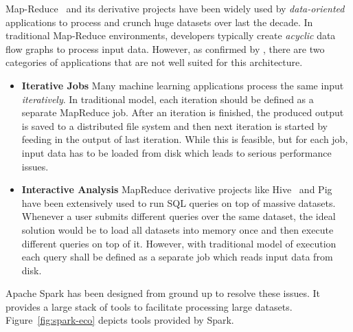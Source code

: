 Map-Reduce~\cite{Dean:2004} and its derivative projects have been widely used by \emph{data-oriented} applications to process and crunch huge datasets over last the decade. In traditional Map-Reduce environments, developers typically create \emph{acyclic} data flow graphs to process input data. However, as confirmed by \textcite{Zaharia:2010}, there are two categories of applications that are not well suited for this architecture.
\begin{itemize}
    \item \textbf{Iterative Jobs} Many machine learning applications process the same input \emph{iteratively}. In traditional model, each iteration should be defined as a separate MapReduce job. After an iteration is finished, the produced output is saved to a distributed file system and then next iteration is started by feeding in the output of last iteration. While this is feasible, but for each job, input data has to be loaded from disk which leads to serious performance issues.
    \item \textbf{Interactive Analysis} MapReduce derivative projects like Hive~\cite{hive} and Pig~\cite{pig} have been extensively used to run SQL queries on top of massive datasets. Whenever a user submits different queries over the same dataset, the ideal solution would be to load all datasets into memory once and then execute different queries on top of it. However, with traditional model of execution each query shall be defined as a separate job which reads input data from disk.
\end{itemize}
Apache Spark has been designed from ground up to resolve these issues. It provides a large stack of tools to facilitate processing large datasets. Figure~\ref{fig:spark-eco} depicts tools provided by Spark.

